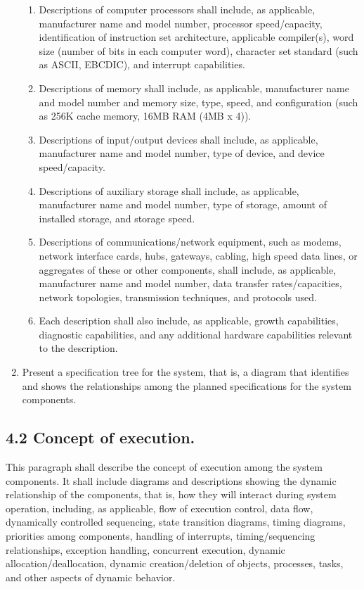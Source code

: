 \begin{enumerate}
  \begin{enumerate}
  \itemsep1pt\parskip0pt
  \item
    Descriptions of computer processors shall include, as applicable,
    manufacturer name and model number, processor speed/capacity,
    identification of instruction set architecture, applicable
    compiler(s), word size (number of bits in each computer word),
    character set standard (such as ASCII, EBCDIC), and interrupt
    capabilities.
  \item
    Descriptions of memory shall include, as applicable, manufacturer
    name and model number and memory size, type, speed, and
    configuration (such as 256K cache memory, 16MB RAM (4MB x 4)).
  \item
    Descriptions of input/output devices shall include, as applicable,
    manufacturer name and model number, type of device, and device
    speed/capacity.
  \item
    Descriptions of auxiliary storage shall include, as applicable,
    manufacturer name and model number, type of storage, amount of
    installed storage, and storage speed.
  \item
    Descriptions of communications/network equipment, such as modems,
    network interface cards, hubs, gateways, cabling, high speed data
    lines, or aggregates of these or other components, shall include, as
    applicable, manufacturer name and model number, data transfer
    rates/capacities, network topologies, transmission techniques, and
    protocols used.
  \item
    Each description shall also include, as applicable, growth
    capabilities, diagnostic capabilities, and any additional hardware
    capabilities relevant to the description.
  \end{enumerate}
\item
  Present a specification tree for the system, that is, a diagram that
  identifies and shows the relationships among the planned
  specifications for the system components.
\end{enumerate}

\subsection{4.2 Concept of execution.}

This paragraph shall describe the concept of execution among the system
components. It shall include diagrams and descriptions showing the
dynamic relationship of the components, that is, how they will interact
during system operation, including, as applicable, flow of execution
control, data flow, dynamically controlled sequencing, state transition
diagrams, timing diagrams, priorities among components, handling of
interrupts, timing/sequencing relationships, exception handling,
concurrent execution, dynamic allocation/deallocation, dynamic
creation/deletion of objects, processes, tasks, and other aspects of
dynamic behavior.


